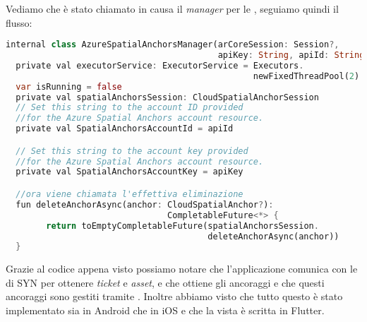 Vediamo che è stato chiamato in causa il \textit{manager} per le \asa{}, seguiamo quindi il flusso:

\begin{lstlisting}[language=dart, label={lst:asa_manager_delete}, firstnumber=1,caption={Eliminazione \textit{cloud anchor} lato Android, chiamata}]
internal class AzureSpatialAnchorsManager(arCoreSession: Session?, 
                                          apiKey: String, apiId: String) {
  private val executorService: ExecutorService = Executors.
                                                 newFixedThreadPool(2)
  var isRunning = false
  private val spatialAnchorsSession: CloudSpatialAnchorSession
  // Set this string to the account ID provided 
  //for the Azure Spatial Anchors account resource.
  private val SpatialAnchorsAccountId = apiId

  // Set this string to the account key provided 
  //for the Azure Spatial Anchors account resource.
  private val SpatialAnchorsAccountKey = apiKey

  //ora viene chiamata l'effettiva eliminazione
  fun deleteAnchorAsync(anchor: CloudSpatialAnchor?): 
                                CompletableFuture<*> {
        return toEmptyCompletableFuture(spatialAnchorsSession.
                                        deleteAnchorAsync(anchor))
  }
\end{lstlisting}

Grazie al codice appena visto possiamo notare che l'applicazione comunica con le \api{} di SYN per ottenere \textit{ticket} e \textit{asset}, e che ottiene gli ancoraggi e che questi ancoraggi sono gestiti tramite \asa{}. Inoltre abbiamo visto che tutto questo è stato implementato sia in Android che in iOS e che la vista è scritta in Flutter.

